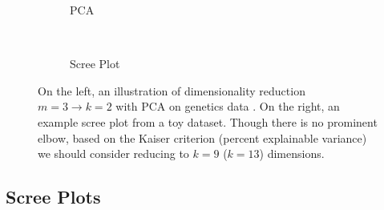 \begin{figure}[H]
  \centering

  \begin{subfigure}[b]{0.48\textwidth}\centering
    \usebox{\largestimage}
    \vspace{0.01cm}
  \caption{PCA}
  \label{fig:dim_reduct:PCA:illustration}
  \end{subfigure}
  ~
  \begin{subfigure}[b]{\wd\largestimage}\centering
  \caption{Scree Plot}
  \label{fig:dim_reduct:PCA:scree}
  \end{subfigure}
\caption{
On the left, an illustration of dimensionality reduction $m=3 \to k=2$ with PCA on genetics data \cite{Scholz2006}.
On the right, an example scree plot from a toy dataset.
Though there is no prominent elbow,
based on the Kaiser criterion (percent explainable variance)
we should consider reducing to $k=9$ ($k=13$) dimensions.
\label{fig:dim_reduct:PCA}
}
\end{figure}

\subsection{Scree Plots}
\label{dim_reduct:PCA:scree}

